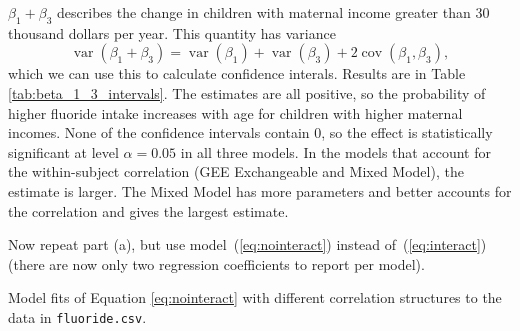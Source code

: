 \documentclass[11pt, letterpaper]{article}
\begin{document}
\begin{enumerate}[(a)]
\begin{description}
  $\beta_1 + \beta_3$ describes the change in children with maternal income
  greater than 30 thousand dollars per year. This quantity has variance
  \begin{equation}
    \operatorname{var}\left(\beta_1 + \beta_3\right)
    = \operatorname{var}\left(\beta_1\right) + \operatorname{var}\left(\beta_3\right) +
    2\operatorname{cov}\left(\beta_1, \beta_3\right),    
  \end{equation}
  which we can use this to calculate confidence interals. Results are in Table
  \ref{tab:beta_1_3_intervals}. The estimates are all positive, so the
  probability of higher fluoride intake increases with age for children with
  higher maternal incomes. None of the confidence intervals contain $0$, so the
  effect is statistically significant at level $\alpha = 0.05$ in all three
  models. In the models that account for the within-subject correlation (GEE
  Exchangeable and Mixed Model), the estimate is larger. The Mixed Model has
  more parameters and better accounts for the correlation and gives the largest
  estimate.
\end{description}
{\em \item Now repeat part (a), but use model~(\ref{eq:nointeract}) instead of~(\ref{eq:interact}) (there are now only two regression coefficients to report per model).}
\begin{table}[ht]
  \scriptsize
  \centering
  
  \caption{Model fits of Equation \ref{eq:nointeract} with different correlation
    structures to the data in \texttt{fluoride.csv}.}
  \label{tab:model_age_full_data_fit}
\end{table}


\end{enumerate}
\end{document}
